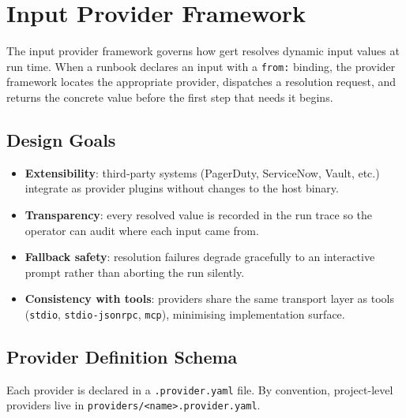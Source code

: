 \chapter{Input Provider Framework}
\label{ch:input-providers}

The input provider framework governs how gert resolves dynamic input values
at run time.  When a runbook declares an input with a \texttt{from:} binding,
the provider framework locates the appropriate provider, dispatches a
resolution request, and returns the concrete value before the first step that
needs it begins.

\section{Design Goals}

\begin{itemize}
  \item \textbf{Extensibility}: third-party systems (PagerDuty, ServiceNow,
        Vault, etc.) integrate as provider plugins without changes to the host
        binary.
  \item \textbf{Transparency}: every resolved value is recorded in the run
        trace so the operator can audit where each input came from.
  \item \textbf{Fallback safety}: resolution failures degrade gracefully to an
        interactive prompt rather than aborting the run silently.
  \item \textbf{Consistency with tools}: providers share the same transport
        layer as tools (\texttt{stdio}, \texttt{stdio-jsonrpc}, \texttt{mcp}),
        minimising implementation surface.
\end{itemize}

\section{Provider Definition Schema}
\label{sec:provider-definition-schema}

Each provider is declared in a \texttt{.provider.yaml} file.  By convention,
project-level providers live in \texttt{providers/<name>.provider.yaml}.

